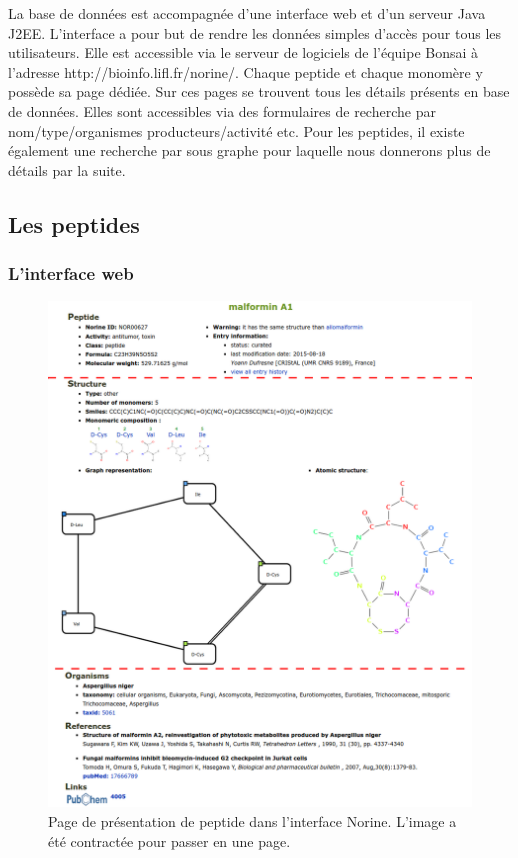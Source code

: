 La base de données est accompagnée d'une interface web et d'un serveur Java J2EE.
L'interface a pour but de rendre les données simples d'accès pour tous les utilisateurs.
Elle est accessible via le serveur de logiciels de l'équipe Bonsai à l'adresse http://bioinfo.lifl.fr/norine/.
Chaque peptide et chaque monomère y possède sa page dédiée.
Sur ces pages se trouvent tous les détails présents en base de données.
Elles sont accessibles via des formulaires de recherche par nom/type/organismes producteurs/activité etc.
Pour les peptides, il existe également une recherche par sous graphe pour laquelle nous donnerons plus de détails par la suite.



\subsection{Les peptides}

\subsubsection{L'interface web}

\begin{figure}[h!]
  \begin{center}
    \includegraphics[width=450px]{Figures/Norine/malformin_nor.png}
    \caption{\label{interface}Page de présentation de peptide dans l'interface Norine.
    L'image a été contractée pour passer en une page.}
  \end{center}
\end{figure}

